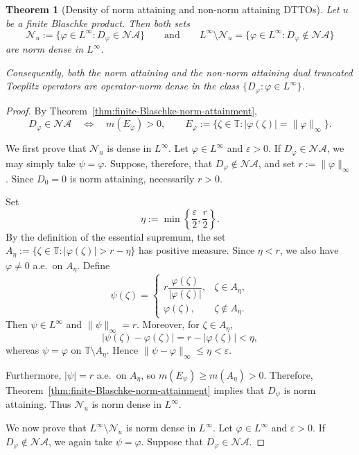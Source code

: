 \documentclass[12pt]{amsart}
\newtheorem{theorem}{Theorem}[section]
\theoremstyle{definition}
\theoremstyle{remark}
\def \T{\mathbb{T}}
\newcommand{\vp}{\varphi}
\numberwithin{equation}{section}
\begin{document}
\begin{theorem}[Density of norm attaining and non-norm attaining DTTOs]\label{thm:NA-density-finite-Blaschke}
Let $u$ be a finite Blaschke product. Then both sets
\[
\mathcal{N}_u:=\{\vp\in L^\infty:D_\vp\in\mathcal{NA}\}
\qquad\text{and}\qquad L^\infty\setminus\mathcal{N}_u
=\{\vp\in L^\infty:D_\vp\notin\mathcal{NA}\}
\]
are norm dense in $L^\infty$.
	
Consequently, both the norm attaining and the non-norm attaining
dual truncated Toeplitz operators are operator-norm dense in the class $\{D_\vp:\vp\in L^\infty\}$.
\end{theorem}

\begin{proof}
By Theorem~\ref{thm:finite-Blaschke-norm-attainment},
\[
D_\vp\in\mathcal{NA}\quad\Longleftrightarrow\quad m(E_\vp)>0,
\qquad E_\vp:=\{\zeta\in\T:|\vp(\zeta)|=\|\vp\|_\infty\}.
\]
	
We first prove that $\mathcal{N}_u$ is dense in $L^\infty$. Let $\vp\in L^\infty$ and $\varepsilon>0$. If $D_\vp\in\mathcal{NA}$, we may simply take $\psi=\vp$. Suppose, therefore, that $D_\vp\notin\mathcal{NA}$, and set $r:=\|\vp\|_\infty$. Since $D_0=0$ is norm attaining, necessarily $r>0$.
	
Set
\[
\eta:=\min\left\{\frac{\varepsilon}{2},\frac{r}{2}\right\}.
\]
By the definition of the essential supremum, the set $A_\eta:=\{\zeta\in\T:|\vp(\zeta)|>r-\eta\}$ has positive measure.
Since $\eta<r$, we also have $\vp\neq0$ a.e.\ on $A_\eta$. Define
\[
\psi(\zeta)
=\begin{cases}
		r\dfrac{\vp(\zeta)}{|\vp(\zeta)|},
		& \zeta\in A_\eta,\\[3mm]
		\vp(\zeta),
		& \zeta\notin A_\eta.
\end{cases}
\]
Then $\psi\in L^\infty$ and $\|\psi\|_\infty=r$. Moreover, for $\zeta\in A_\eta$,
\[
|\psi(\zeta)-\vp(\zeta)|=r-|\vp(\zeta)|<\eta,
\]
whereas $\psi=\vp$ on $\T\setminus A_\eta$. Hence $\|\psi-\vp\|_\infty\leq\eta<\varepsilon$.
	
Furthermore, $|\psi|=r$ a.e.\ on $A_\eta$, so $m(E_\psi)\geq m(A_\eta)>0$. Therefore, Theorem~\ref{thm:finite-Blaschke-norm-attainment} implies that
$D_\psi$ is norm attaining. Thus $\mathcal{N}_u$ is norm dense in
$L^\infty$.
	
We now prove that $L^\infty\setminus\mathcal{N}_u$ is norm dense in
$L^\infty$. Let $\vp\in L^\infty$ and $\varepsilon>0$. If $D_\vp\notin\mathcal{NA}$, we again take $\psi=\vp$. Suppose that
$D_\vp\in\mathcal{NA}$.
	

\end{proof}
\end{document}
